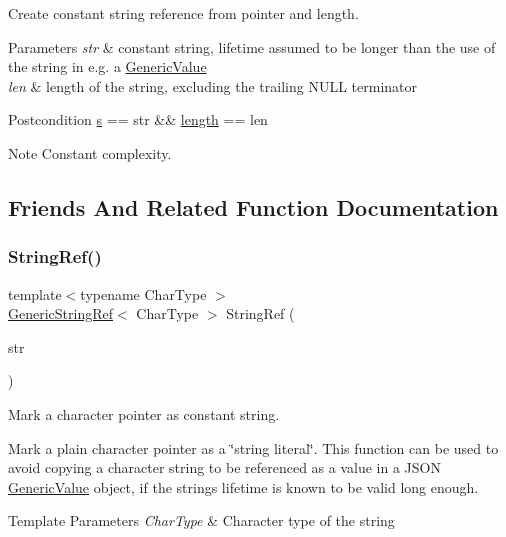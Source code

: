 Create constant string reference from pointer and length. 


\begin{DoxyParams}{Parameters}
{\em str} & constant string, lifetime assumed to be longer than the use of the string in e.\+g. a \hyperlink{classGenericValue}{Generic\+Value} \\
\hline
{\em len} & length of the string, excluding the trailing N\+U\+LL terminator\\
\hline
\end{DoxyParams}
\begin{DoxyPostcond}{Postcondition}
\hyperlink{structGenericStringRef_aec7a5900ea6f3e42f0ea8403d5135103}{s} == str \&\& \hyperlink{structGenericStringRef_a4a96d618744ad73f766a1551b1d517fe}{length} == len 
\end{DoxyPostcond}
\begin{DoxyNote}{Note}
Constant complexity. 
\end{DoxyNote}


\subsection{Friends And Related Function Documentation}
\mbox{\label{structGenericStringRef_aa6b9fd9f6aa49405a574c362ba9af6b5}} 
\subsubsection{\texorpdfstring{String\+Ref()}{StringRef()}\hspace{0.1cm}{\footnotesize\ttfamily [1/2]}}
{\footnotesize\ttfamily template$<$typename Char\+Type $>$ \\
\hyperlink{structGenericStringRef}{Generic\+String\+Ref}$<$ Char\+Type $>$ String\+Ref (\begin{DoxyParamCaption}\item[{const Char\+Type $\ast$}]{str }\end{DoxyParamCaption})\hspace{0.3cm}{\ttfamily [related]}}



Mark a character pointer as constant string. 

Mark a plain character pointer as a \char`\"{}string literal\char`\"{}. This function can be used to avoid copying a character string to be referenced as a value in a J\+S\+ON \hyperlink{classGenericValue}{Generic\+Value} object, if the string\textquotesingle{}s lifetime is known to be valid long enough. 
\begin{DoxyTemplParams}{Template Parameters}
{\em Char\+Type} & Character type of the string \\
\hline
\end{DoxyTemplParams}

